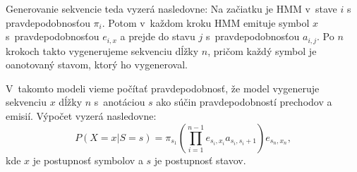 Generovanie sekvencie teda vyzerá nasledovne: Na začiatku je HMM v~stave $i$ s pravdepodobnosťou $\pi_i$. Potom v~každom kroku HMM emituje symbol $x$ s~pravdepodobnosťou $e_{i, x}$ a prejde do stavu $j$ s~pravdepodobnosťou $a_{i,j}$. Po $n$ krokoch takto vygenerujeme sekvenciu dĺžky $n$, pričom každý symbol je oanotovaný stavom, ktorý ho vygeneroval.

V~takomto modeli vieme počítať pravdepodobnosť, že model vygeneruje sekvenciu $x$ dĺžky $n$ s~anotáciou $s$ ako súčin pravdepodobností prechodov a emisií.
Výpočet vyzerá nasledovne:
$$P(X=x | S=s) = \pi_{s_1}\left(\prod_{i=1}^{n-1} e_{s_i,x_i} a_{s_i,s_i+1}\right)e_{s_n,x_n},$$
kde $x$ je postupnosť symbolov a $s$ je postupnosť stavov.

\cite{skripta, durbin}







